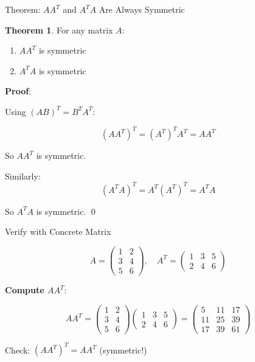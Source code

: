 \documentclass[10pt]{beamer}
\theoremstyle{definition}
\newtheorem{thm}{Theorem}[section]
\newcommand{\x}[1]{\alert{\textbf{#1}}}
\begin{document}
\begin{frame}{Theorem: $AA^T$ and $A^T A$ Are Always Symmetric}

\begin{thm}
For any matrix $A$:
\begin{enumerate}
\item $AA^T$ is symmetric
\item $A^T A$ is symmetric
\end{enumerate}
\end{thm}

\vspace{1em}

\x{Proof}:

Using $(AB)^T = B^T A^T$:

$$(AA^T)^T = (A^T)^T A^T = A A^T$$

So $AA^T$ is symmetric.

\vspace{1em}

Similarly:
$$(A^T A)^T = A^T (A^T)^T = A^T A$$

So $A^T A$ is symmetric. \qed

\end{frame}

\begin{frame}{Verify with Concrete Matrix}

$$A = \begin{pmatrix} 1 & 2 \\ 3 & 4 \\ 5 & 6 \end{pmatrix}, \quad A^T = \begin{pmatrix} 1 & 3 & 5 \\ 2 & 4 & 6 \end{pmatrix}$$

\vspace{1em}

\x{Compute $AA^T$}:

$$AA^T = \begin{pmatrix} 1 & 2 \\ 3 & 4 \\ 5 & 6 \end{pmatrix} \begin{pmatrix} 1 & 3 & 5 \\ 2 & 4 & 6 \end{pmatrix} = \begin{pmatrix} 5 & 11 & 17 \\ 11 & 25 & 39 \\ 17 & 39 & 61 \end{pmatrix}$$

Check: $(AA^T)^T = AA^T$ \checkmark \quad (symmetric!)

\end{frame}
\end{document}
